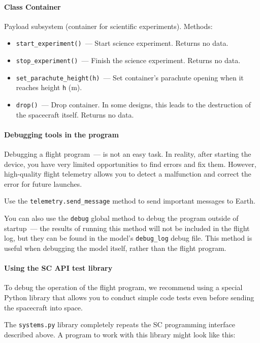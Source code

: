 \documentclass[12pt,a4paper]{article}
\begin{document}
\paragraph{Class Container}

Payload subsystem (container for scientific experiments). Methods:

\begin{itemize}
\item \verb'start_experiment()'~--- Start science experiment. Returns no data.
\item \verb'stop_experiment()'~--- Finish the science experiment. Returns no data.
\item \verb'set_parachute_height(h)'~--- Set container's parachute opening when it reaches height \verb'h' (m).
\item \verb'drop()'~--- Drop container. In some designs, this leads to the destruction of the spacecraft itself. Returns no data.
\end{itemize}

\paragraph{Debugging tools in the program}

Debugging a flight program~--- is not an easy task. In reality, after starting the device, you have very limited opportunities to find errors and fix them. However, high-quality flight telemetry allows you to detect a malfunction and correct the error for future launches.

Use the \verb'telemetry.send_message' method to send important messages to Earth.

You can also use the \verb'debug' global method to debug the program outside of startup~--- the results of running this method will not be included in the flight log, but they can be found in the model's \verb'debug_log' debug file. This method is useful when debugging the model itself, rather than the flight program.

\paragraph{Using the SC API test library}

To debug the operation of the flight program, we recommend using a special Python library that allows you to conduct simple code tests even before sending the spacecraft into space.

The \verb'systems.py' library completely repeats the SC programming interface described above. A program to work with this library might look like this:
\end{document}
